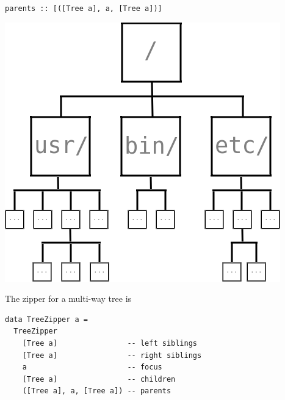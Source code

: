 \begin{frame}[fragile]
\begin{block}{\lstinline{parents :: [([Tree a], a, [Tree a])]}}
\begin{center}
\includegraphics[width=0.60\textheight]{image/rosetree.png}
\end{center}
\end{block}
\end{frame}

\begin{frame}[fragile]
\begin{block}{The zipper for a multi-way tree is}
\begin{lstlisting}[style=haskell]
data TreeZipper a =
  TreeZipper
    [Tree a]                -- left siblings
    [Tree a]                -- right siblings
    a                       -- focus
    [Tree a]                -- children
    ([Tree a], a, [Tree a]) -- parents
\end{lstlisting}
\end{block}
\end{frame}

